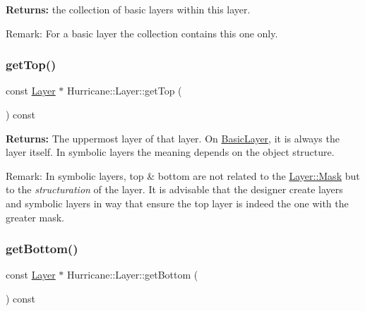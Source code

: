 {\bfseries Returns\+:} the collection of basic layers within this layer.

\begin{DoxyParagraph}{Remark\+:}
For a basic layer the collection contains this one only. 
\end{DoxyParagraph}
\mbox{\label{classHurricane_1_1Layer_a5f7c43a29f3dd02a9ebccbcbf91d6727}} 
\subsubsection{\texorpdfstring{get\+Top()}{getTop()}}
{\footnotesize\ttfamily const \hyperlink{classHurricane_1_1Layer}{Layer} $\ast$ Hurricane\+::\+Layer\+::get\+Top (\begin{DoxyParamCaption}{ }\end{DoxyParamCaption}) const\hspace{0.3cm}{\ttfamily [virtual]}}

{\bfseries Returns\+:} The uppermost layer of that layer. On \hyperlink{classHurricane_1_1BasicLayer}{Basic\+Layer}, it is always the layer itself. In symbolic layers the meaning depends on the object structure.

\begin{DoxyParagraph}{Remark\+:}
In symbolic layers, top \& bottom are not related to the \hyperlink{classHurricane_1_1Layer_af5277c670637bd5d910237e7afe01a91}{Layer\+::\+Mask} but to the {\itshape structuration} of the layer. It is advisable that the designer create layers and symbolic layers in way that ensure the top layer is indeed the one with the greater mask. 
\end{DoxyParagraph}
\mbox{\label{classHurricane_1_1Layer_a4dab4552a219d2d900ed0b1245dc6580}} 
\subsubsection{\texorpdfstring{get\+Bottom()}{getBottom()}}
{\footnotesize\ttfamily const \hyperlink{classHurricane_1_1Layer}{Layer} $\ast$ Hurricane\+::\+Layer\+::get\+Bottom (\begin{DoxyParamCaption}{ }\end{DoxyParamCaption}) const\hspace{0.3cm}{\ttfamily [virtual]}}

